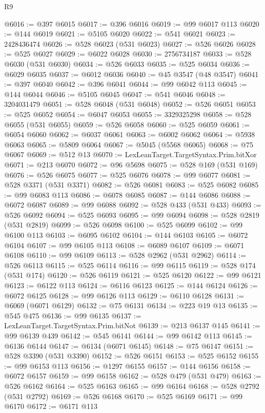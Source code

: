 \begin{lexlean}{R9}
\begin{coremodule}
@6016 := @397 @6015
@6017 := @396 @6016
@6019 := @99 @6017 @113
@6020 := @144 @6019
@6021 := @5105 @6020
@6022 := @541 @6021
@6023 := 2428436474
@6026 := @528 @6023 (@531 @6023)
@6027 := @526 @6026
@6028 := @525 @6027
@6029 := @6022 @6028
@6030 := 2756734187
@6033 := @528 @6030 (@531 @6030)
@6034 := @526 @6033
@6035 := @525 @6034
@6036 := @6029 @6035
@6037 := @6012 @6036
@6040 := @45 @3547 (@48 @3547)
@6041 := @397 @6040
@6042 := @396 @6041
@6044 := @99 @6042 @113
@6045 := @144 @6044
@6046 := @5105 @6045
@6047 := @541 @6046
@6048 := 3204031479
@6051 := @528 @6048 (@531 @6048)
@6052 := @526 @6051
@6053 := @525 @6052
@6054 := @6047 @6053
@6055 := 3329325298
@6058 := @528 @6055 (@531 @6055)
@6059 := @526 @6058
@6060 := @525 @6059
@6061 := @6054 @6060
@6062 := @6037 @6061
@6063 := @6002 @6062
@6064 := @5938 @6063
@6065 := @5809 @6064
@6067 := @5045 (@5568 @6065)
@6068 := @75 @6067
@6069 := @512 @13
@6070 := LexLeanTarget.TargetSyntax.Prim.bitXor
@6071 := @213 @6070
@6072 := @96 @5698
@6075 := @528 @169 (@531 @169)
@6076 := @526 @6075
@6077 := @525 @6076
@6078 := @99 @6077
@6081 := @528 @3371 (@531 @3371)
@6082 := @526 @6081
@6083 := @525 @6082
@6085 := @99 @6083 @113
@6086 := @6078 @6085
@6087 := @144 @6086
@6088 := @6072 @6087
@6089 := @99 @6088
@6092 := @528 @433 (@531 @433)
@6093 := @526 @6092
@6094 := @525 @6093
@6095 := @99 @6094
@6098 := @528 @2819 (@531 @2819)
@6099 := @526 @6098
@6100 := @525 @6099
@6102 := @99 @6100 @113
@6103 := @6095 @6102
@6104 := @144 @6103
@6105 := @6072 @6104
@6107 := @99 @6105 @113
@6108 := @6089 @6107
@6109 := @6071 @6108
@6110 := @99 @6109
@6113 := @528 @2962 (@531 @2962)
@6114 := @526 @6113
@6115 := @525 @6114
@6116 := @99 @6115
@6119 := @528 @174 (@531 @174)
@6120 := @526 @6119
@6121 := @525 @6120
@6122 := @99 @6121
@6123 := @6122 @113
@6124 := @6116 @6123
@6125 := @144 @6124
@6126 := @6072 @6125
@6128 := @99 @6126 @113
@6129 := @6110 @6128
@6131 := @6069 (@6071 @6129)
@6132 := @75 @6131
@6134 := @223 @19 @13
@6135 := @545 @475
@6136 := @99 @6135
@6137 := LexLeanTarget.TargetSyntax.Prim.bitNot
@6139 := @213 @6137 @145
@6141 := @99 @6139 @439
@6142 := @545 @6141
@6144 := @99 @6142 @113
@6145 := @6136 @6144
@6147 := @6134 (@6071 @6145)
@6148 := @75 @6147
@6151 := @528 @3390 (@531 @3390)
@6152 := @526 @6151
@6153 := @525 @6152
@6155 := @99 @6153 @113
@6156 := @1297 @6155
@6157 := @144 @6156
@6158 := @6072 @6157
@6159 := @99 @6158
@6162 := @528 @479 (@531 @479)
@6163 := @526 @6162
@6164 := @525 @6163
@6165 := @99 @6164
@6168 := @528 @2792 (@531 @2792)
@6169 := @526 @6168
@6170 := @525 @6169
@6171 := @99 @6170
@6172 := @6171 @113

\end{coremodule}
\end{lexlean}
